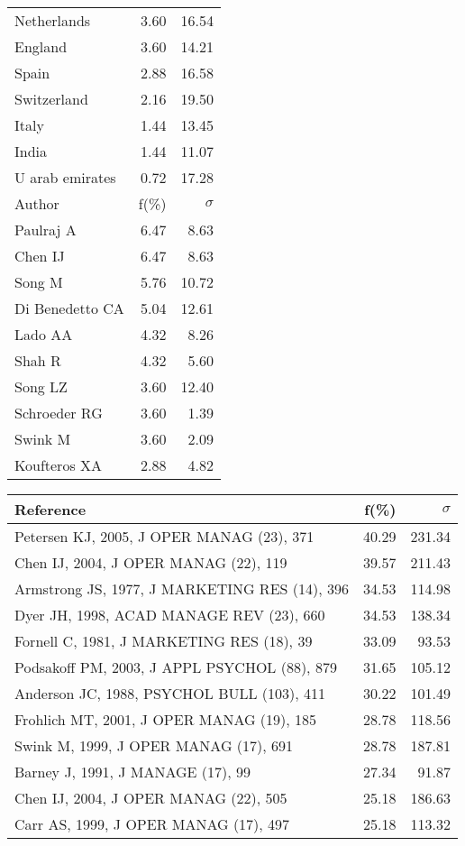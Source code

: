 \documentclass[a4paper,11pt]{report}
\begin{document}
\begin{landscape}
\begin{table}[!ht]
{\begin{tabular}{|l r r|}
Netherlands & 3.60 & 16.54\\
England & 3.60 & 14.21\\
Spain & 2.88 & 16.58\\
Switzerland & 2.16 & 19.50\\
Italy & 1.44 & 13.45\\
India & 1.44 & 11.07\\
U arab emirates & 0.72 & 17.28\\
\hline
\hline
Author & f(\%) & $\sigma$\\
\hline
Paulraj A & 6.47 & 8.63\\
Chen IJ & 6.47 & 8.63\\
Song M & 5.76 & 10.72\\
Di Benedetto CA & 5.04 & 12.61\\
Lado AA & 4.32 & 8.26\\
Shah R & 4.32 & 5.60\\
Song LZ & 3.60 & 12.40\\
Schroeder RG & 3.60 & 1.39\\
Swink M & 3.60 & 2.09\\
Koufteros XA & 2.88 & 4.82\\
\hline
\end{tabular}
}
{\scriptsize\begin{tabular}{|l r r|}
\hline
Reference & f(\%) & $\sigma$\\
\hline
Petersen KJ, 2005, J OPER MANAG (23), 371 & 40.29 & 231.34\\
Chen IJ, 2004, J OPER MANAG (22), 119 & 39.57 & 211.43\\
Armstrong JS, 1977, J MARKETING RES (14), 396 & 34.53 & 114.98\\
Dyer JH, 1998, ACAD MANAGE REV (23), 660 & 34.53 & 138.34\\
Fornell C, 1981, J MARKETING RES (18), 39 & 33.09 & 93.53\\
Podsakoff PM, 2003, J APPL PSYCHOL (88), 879 & 31.65 & 105.12\\
Anderson JC, 1988, PSYCHOL BULL (103), 411 & 30.22 & 101.49\\
Frohlich MT, 2001, J OPER MANAG (19), 185 & 28.78 & 118.56\\
Swink M, 1999, J OPER MANAG (17), 691 & 28.78 & 187.81\\
Barney J, 1991, J MANAGE (17), 99 & 27.34 & 91.87\\
Chen IJ, 2004, J OPER MANAG (22), 505 & 25.18 & 186.63\\
Carr AS, 1999, J OPER MANAG (17), 497 & 25.18 & 113.32\\

\end{tabular}}
\end{table}
\end{landscape}
\end{document}
